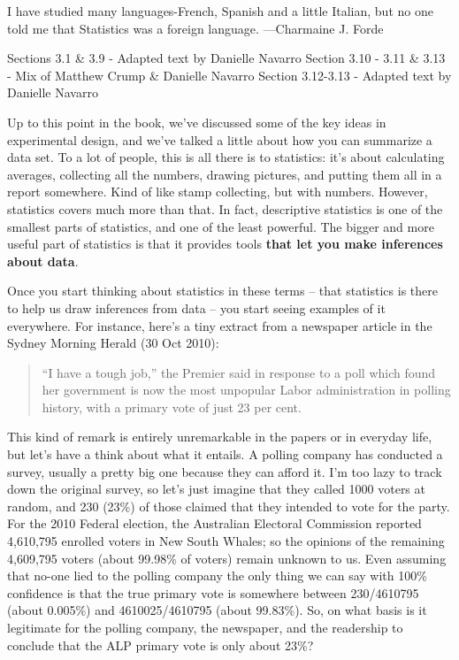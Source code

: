 \documentclass[
]{book}
\begin{document}
{
I have studied many languages-French, Spanish and a little Italian, but no one told me that Statistics was a foreign language.
---Charmaine J. Forde
}

Sections 3.1 \& 3.9 - Adapted text by Danielle Navarro
Section 3.10 - 3.11 \& 3.13 - Mix of Matthew Crump \& Danielle Navarro
Section 3.12-3.13 - Adapted text by Danielle Navarro

Up to this point in the book, we've discussed some of the key ideas in experimental design, and we've talked a little about how you can summarize a data set. To a lot of people, this is all there is to statistics: it's about calculating averages, collecting all the numbers, drawing pictures, and putting them all in a report somewhere. Kind of like stamp collecting, but with numbers. However, statistics covers much more than that. In fact, descriptive statistics is one of the smallest parts of statistics, and one of the least powerful. The bigger and more useful part of statistics is that it provides tools \textbf{that let you make inferences about data}.

Once you start thinking about statistics in these terms -- that statistics is there to help us draw inferences from data -- you start seeing examples of it everywhere. For instance, here's a tiny extract from a newspaper article in the Sydney Morning Herald (30 Oct 2010):

\begin{quote}
``I have a tough job,'' the Premier said in response to a poll which found her government is now the most unpopular Labor administration in polling history, with a primary vote of just 23 per cent.
\end{quote}

This kind of remark is entirely unremarkable in the papers or in everyday life, but let's have a think about what it entails. A polling company has conducted a survey, usually a pretty big one because they can afford it. I'm too lazy to track down the original survey, so let's just imagine that they called 1000 voters at random, and 230 (23\%) of those claimed that they intended to vote for the party. For the 2010 Federal election, the Australian Electoral Commission reported 4,610,795 enrolled voters in New South Whales; so the opinions of the remaining 4,609,795 voters (about 99.98\% of voters) remain unknown to us. Even assuming that no-one lied to the polling company the only thing we can say with 100\% confidence is that the true primary vote is somewhere between 230/4610795 (about 0.005\%) and 4610025/4610795 (about 99.83\%). So, on what basis is it legitimate for the polling company, the newspaper, and the readership to conclude that the ALP primary vote is only about 23\%?
\end{document}
